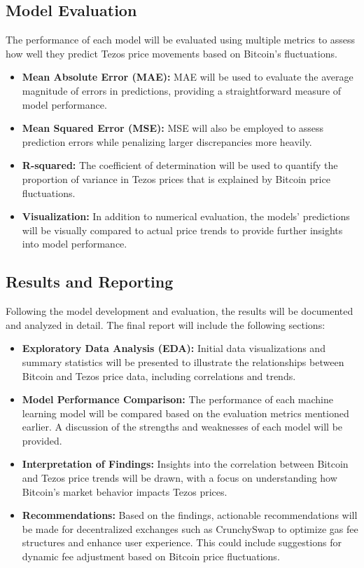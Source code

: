 \subsection{Model Evaluation}
The performance of each model will be evaluated using multiple metrics to assess how well they predict Tezos price movements based on Bitcoin’s fluctuations.

\begin{itemize}
    \item \textbf{Mean Absolute Error (MAE):} MAE will be used to evaluate the average magnitude of errors in predictions, providing a straightforward measure of model performance.
    \item \textbf{Mean Squared Error (MSE):} MSE will also be employed to assess prediction errors while penalizing larger discrepancies more heavily.
    \item \textbf{R-squared:} The coefficient of determination will be used to quantify the proportion of variance in Tezos prices that is explained by Bitcoin price fluctuations.
    \item \textbf{Visualization:} In addition to numerical evaluation, the models’ predictions will be visually compared to actual price trends to provide further insights into model performance.
\end{itemize}

\subsection{Results and Reporting}
Following the model development and evaluation, the results will be documented and analyzed in detail. The final report will include the following sections:

\begin{itemize}
    \item \textbf{Exploratory Data Analysis (EDA):} Initial data visualizations and summary statistics will be presented to illustrate the relationships between Bitcoin and Tezos price data, including correlations and trends.
    \item \textbf{Model Performance Comparison:} The performance of each machine learning model will be compared based on the evaluation metrics mentioned earlier. A discussion of the strengths and weaknesses of each model will be provided.
    \item \textbf{Interpretation of Findings:} Insights into the correlation between Bitcoin and Tezos price trends will be drawn, with a focus on understanding how Bitcoin’s market behavior impacts Tezos prices.
    \item \textbf{Recommendations:} Based on the findings, actionable recommendations will be made for decentralized exchanges such as CrunchySwap to optimize gas fee structures and enhance user experience. This could include suggestions for dynamic fee adjustment based on Bitcoin price fluctuations.
\end{itemize}

